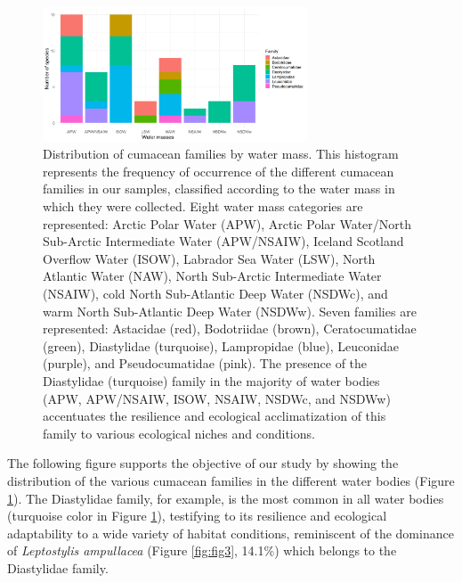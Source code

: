 \begin{figure}[htbp]
    \centering
    \includegraphics[width=0.7\textwidth]{figure3.png}
    \caption{Distribution of cumacean families by water mass. This histogram represents the frequency of occurrence of the different cumacean families in our samples, classified according to the water mass in which they were collected. Eight water mass categories are represented: Arctic Polar Water (APW), Arctic Polar Water/North Sub-Arctic Intermediate Water (APW/NSAIW), Iceland Scotland Overflow Water (ISOW), Labrador Sea Water (LSW), North Atlantic Water (NAW), North Sub-Arctic Intermediate Water (NSAIW), cold North Sub-Atlantic Deep Water (NSDWc), and warm North Sub-Atlantic Deep Water (NSDWw). Seven families are represented: Astacidae (red), Bodotriidae (brown), Ceratocumatidae (green), Diastylidae (turquoise), Lampropidae (blue), Leuconidae (purple), and Pseudocumatidae (pink). The presence of the Diastylidae (turquoise) family in the majority of water bodies (APW, APW/NSAIW, ISOW, NSAIW, NSDWc, and NSDWw) accentuates the resilience and ecological acclimatization of this family to various ecological niches and conditions. \label{fig:fig4}}
\end{figure}

The following figure supports the objective of our study by showing the distribution of the various cumacean families in the different water bodies (Figure \ref{fig:fig4}). The Diastylidae family, for example, is the most common in all water bodies (turquoise color in Figure \ref{fig:fig4}), testifying to its resilience and ecological adaptability to a wide variety of habitat conditions, reminiscent of the dominance of \emph{Leptostylis ampullacea} (Figure \ref{fig:fig3}, 14.1\%) which belongs to the Diastylidae family. 

